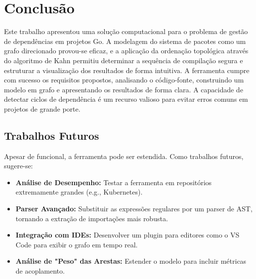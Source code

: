 \documentclass[12pt]{article}
\begin{document}
\section{Conclusão}
Este trabalho apresentou uma solução computacional para o problema de gestão de dependências em projetos Go. A modelagem do sistema de pacotes como um grafo direcionado provou-se eficaz, e a aplicação da ordenação topológica através do algoritmo de Kahn \cite{kahn1962} permitiu determinar a sequência de compilação segura e estruturar a visualização dos resultados de forma intuitiva. A ferramenta cumpre com sucesso os requisitos propostos, analisando o código-fonte, construindo um modelo em grafo e apresentando os resultados de forma clara. A capacidade de detectar ciclos de dependência é um recurso valioso para evitar erros comuns em projetos de grande porte.

\subsection{Trabalhos Futuros}
Apesar de funcional, a ferramenta pode ser estendida. Como trabalhos futuros, sugere-se:
\begin{itemize}
    \item \textbf{Análise de Desempenho:} Testar a ferramenta em repositórios extremamente grandes (e.g., Kubernetes).
    \item \textbf{Parser Avançado:} Substituir as expressões regulares por um parser de AST, tornando a extração de importações mais robusta.
    \item \textbf{Integração com IDEs:} Desenvolver um plugin para editores como o VS Code para exibir o grafo em tempo real.
    \item \textbf{Análise de "Peso" das Arestas:} Estender o modelo para incluir métricas de acoplamento.
\end{itemize}



\end{document}
